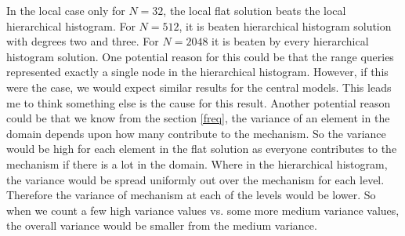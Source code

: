 \documentclass[11pt]{article}
\theoremstyle{definition}
\begin{document}
In the local case only for $N=32$, the local flat solution beats the local hierarchical histogram. For $N=512$, it is beaten hierarchical histogram solution with degrees two and three. For $N=2048$ it is beaten by every hierarchical histogram solution. One potential reason for this could be that the range queries represented exactly a single node in the hierarchical histogram. However, if this were the case, we would expect similar results for the central models. This leads me to think something else is the cause for this result. Another potential reason could be that we know from the section \ref{freq}, the variance of an element in the domain depends upon how many contribute to the mechanism. So the variance would be high for each element in the flat solution as everyone contributes to the mechanism if there is a lot in the domain. Where in the hierarchical histogram, the variance would be spread uniformly out over the mechanism for each level. Therefore the variance of mechanism at each of the levels would be lower. So when we count a few high variance values vs. some more medium variance values, the overall variance would be smaller from the medium variance.
\end{document}
